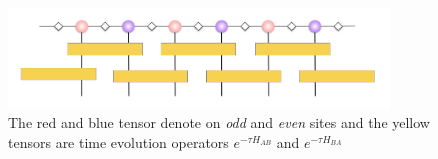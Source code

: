 \begin{figure}[ht]
	\centering
	\includegraphics[width=0.90\textwidth]{figures/fig312.png}
	\caption[The tensor diagram of imaginary time evolving block decimation.]{The red and blue tensor denote on \textit{odd} and \textit{even} sites and the yellow tensors are time evolution operators $e^{-\tau H_{AB}}$ and $e^{-\tau H_{BA}}$}
	\label{fig313}
\end{figure}

